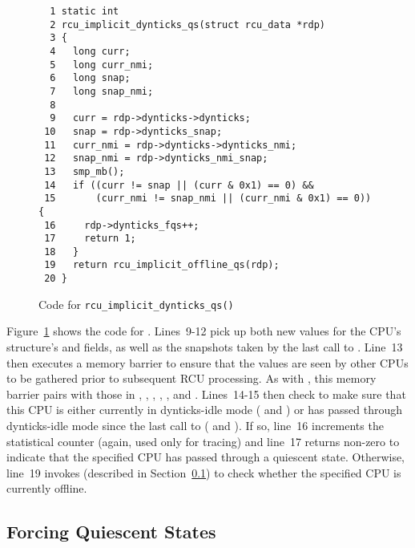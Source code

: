 \begin{figure}[tbp]
{ \scriptsize
\begin{verbatim}
  1 static int
  2 rcu_implicit_dynticks_qs(struct rcu_data *rdp)
  3 {
  4   long curr;
  5   long curr_nmi;
  6   long snap;
  7   long snap_nmi;
  8
  9   curr = rdp->dynticks->dynticks;
 10   snap = rdp->dynticks_snap;
 11   curr_nmi = rdp->dynticks->dynticks_nmi;
 12   snap_nmi = rdp->dynticks_nmi_snap;
 13   smp_mb();
 14   if ((curr != snap || (curr & 0x1) == 0) &&
 15       (curr_nmi != snap_nmi || (curr_nmi & 0x1) == 0)) {
 16     rdp->dynticks_fqs++;
 17     return 1;
 18   }
 19   return rcu_implicit_offline_qs(rdp);
 20 }
\end{verbatim}
}
\caption{Code for {\tt rcu\_\-implicit\_\-dynticks\_\-qs()}}
\label{fig:app:rcuimpl:rcutreewt:Code for rcu-implicit-dynticks-qs}
\end{figure}

Figure~\ref{fig:app:rcuimpl:rcutreewt:Code for rcu-implicit-dynticks-qs}
shows the code for .
Lines~9-12 pick up both new values for the CPU's 
structure's  and  fields, as well
as the snapshots taken by the last call to
.
Line~13 then executes a memory barrier to ensure that the values are
seen by other CPUs to be gathered prior to subsequent RCU processing.
As with , this memory barrier
pairs with those in ,
, , ,
, and .
Lines~14-15 then check to make sure that this CPU is either currently
in dynticks-idle mode ( and
) or has passed through dynticks-idle mode
since the last call to 
( and ).
If so, line~16 increments the  statistical
counter (again, used only for tracing) and line~17 returns non-zero
to indicate that the specified CPU has passed through a quiescent state.
Otherwise, line~19 invokes 
(described in Section~\ref{app:rcuimpl:rcutreewt:Forcing Quiescent States})
to check whether the specified CPU is currently offline.

\subsection{Forcing Quiescent States}
\label{app:rcuimpl:rcutreewt:Forcing Quiescent States}

